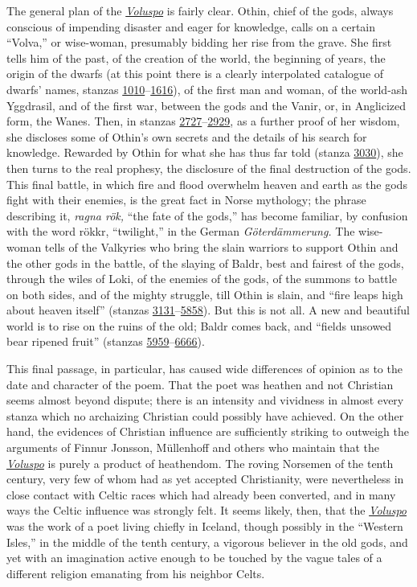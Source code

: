\documentclass{scrbook}
\makeatletter
\newcommand{\ndash}{--}
\newcommand{\chapterref}[1]{\hyperref[cha:#1]{\emph{#1}}}
\newcommand{\stanzaref}[2][\@empty]{\ifx\@empty#1\hyperref[\thischapterlabel:#2]{#2}\else\hyperref[cha:#1:#2]{#2}\fi}
\newcommand{\stanzarangeref}[3][\@empty]{\stanzaref[#1]{#2}\ndash\stanzaref[#1]{#3}}
\makeatother
\begin{document}
The general plan of the \chapterref{Voluspo} is fairly clear. Othin, chief of the gods, always conscious of impending disaster and eager for knowledge, calls on a certain ``Volva,'' or wise-woman, presumably bidding her rise from the grave. She first tells him of the past, of the creation of the world, the beginning of years, the origin of the dwarfs (at this point there is a clearly interpolated catalogue of dwarfs' names, stanzas \stanzarangeref{10}{16}), of the first man and woman, of the world-ash Yggdrasil, and of the first war, between the gods and the Vanir, or, in Anglicized form, the Wanes. Then, in stanzas \stanzarangeref{27}{29}, as a further proof of her wisdom, she discloses some of Othin's own secrets and the details of his search for knowledge. Rewarded by Othin for what she has thus far told (stanza \stanzaref{30}), she then turns to the real prophesy, the disclosure of the final destruction of the gods. This final battle, in which fire and flood overwhelm heaven and earth as the gods fight with their enemies, is the great fact in Norse mythology; the phrase describing it, \emph{ragna rök,} ``the fate of the gods,'' has become familiar, by confusion with the word rökkr, ``twilight,'' in the German \emph{Göterdämmerung.} The wise-woman tells of the Valkyries who bring the slain warriors to support Othin and the other gods in the battle, of the slaying of Baldr, best and fairest of the gods, through the wiles of Loki, of the enemies of the gods, of the summons to battle on both sides, and of the mighty struggle, till Othin is slain, and ``fire leaps high about heaven itself'' (stanzas \stanzarangeref{31}{58}). But this is not all. A new and beautiful world is to rise on the ruins of the old; Baldr comes back, and ``fields unsowed bear ripened fruit'' (stanzas \stanzarangeref{59}{66}).

This final passage, in particular, has caused wide differences of opinion as to the date and character of the poem. That the poet was heathen and not Christian seems almost beyond dispute; there is an intensity and vividness in almost every stanza which no archaizing Christian could possibly have achieved. On the other hand, the evidences of Christian influence are sufficiently striking to outweigh the arguments of Finnur Jonsson, Müllenhoff and others who maintain that the \chapterref{Voluspo} is purely a product of heathendom. The roving Norsemen of the tenth century, very few of whom had as yet accepted Christianity, were nevertheless in close contact with Celtic races which had already been converted, and in many ways the Celtic influence was strongly felt. It seems likely, then, that the \chapterref{Voluspo} was the work of a poet living chiefly in Iceland, though possibly in the ``Western Isles,'' in the middle of the tenth century, a vigorous believer in the old gods, and yet with an imagination active enough to be touched by the vague tales of a different religion emanating from his neighbor Celts.
\end{document}
